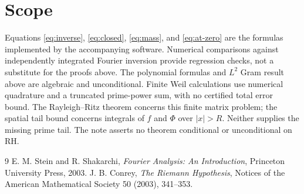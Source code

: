 \documentclass[11pt]{article}
\begin{document}
\section{Scope}

Equations \eqref{eq:inverse}, \eqref{eq:closed}, \eqref{eq:mass}, and
\eqref{eq:at-zero} are the formulas implemented by the accompanying
software. Numerical comparisons against independently integrated Fourier
inversion provide regression checks, not a substitute for the proofs above.
The polynomial formulas and $L^2$ Gram result above are algebraic and
unconditional. Finite Weil calculations use numerical quadrature and a
truncated prime-power sum, with no certified total error bound. The
Rayleigh--Ritz theorem concerns this finite matrix problem; the spatial
tail bound concerns integrals of $f$ and $\Phi$ over $|x|>R$. Neither
supplies the missing prime tail. The note asserts no theorem conditional
or unconditional on RH.

\begin{thebibliography}{9}
E. M. Stein and R. Shakarchi, \emph{Fourier Analysis: An Introduction},
Princeton University Press, 2003.
J. B. Conrey, \emph{The Riemann Hypothesis},
Notices of the American Mathematical Society 50 (2003), 341--353.
\end{thebibliography}
\end{document}
